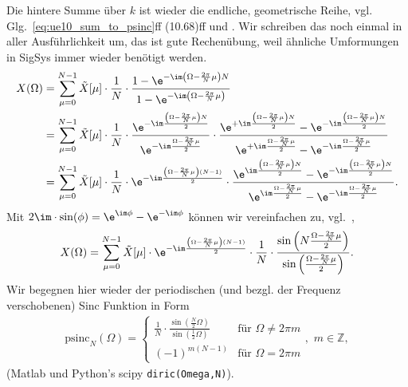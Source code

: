 \begin{ExCalc}
Die hintere Summe über $k$ ist wieder die endliche, geometrische Reihe,
vgl. Glg.~\eqref{eq:ue10_sum_to_psinc}ff (10.68)ff
und \cite[(3-39)]{Lyons2011}.
Wir schreiben das noch einmal in aller Ausführlichkeit um, das ist gute Rechenübung,
weil ähnliche Umformungen in SigSys immer wieder benötigt werden.
%
\begin{align}
X(\Omega)&=\sum_{\mu=0}^{N-1}\tilde{X}[\mu]\cdot\frac{1}{N}\cdot\frac{1-\e^{-\im\left(\Omega-\frac{2\pi}{N}\mu\right)N}}{1-\e^{-\im\left(\Omega-\frac{2\pi}{N}\mu\right)}}\\
&=\sum_{\mu=0}^{N-1}\tilde{X}[\mu]\cdot\frac{1}{N}\cdot\frac{\e^{-\im\frac{\left(\Omega-\frac{2\pi}{N}\mu\right)N}{2}}}{\e^{-\im\frac{\Omega-\frac{2\pi}{N}\mu}{2}}}\cdot\frac{\e^{+\im\frac{\left(\Omega-\frac{2\pi}{N}\mu\right)N}{2}}-\e^{-\im\frac{\left(\Omega-\frac{2\pi}{N}\mu\right)N}{2}}}{\e^{+\im\frac{\Omega-\frac{2\pi}{N}\mu}{2}}-\e^{-\im\frac{\Omega-\frac{2\pi}{N}\mu}{2}}}\\
&=\sum_{\mu=0}^{N-1}\tilde{X}[\mu]\cdot\frac{1}{N}\cdot\e^{-\im\frac{\left(\Omega-\frac{2\pi}{N}\mu\right)(N-1)}{2}}\cdot\frac{\e^{\im\frac{\left(\Omega-\frac{2\pi}{N}\mu\right)N}{2}}-\e^{-\im\frac{\left(\Omega-\frac{2\pi}{N}\mu\right)N}{2}}}{\e^{\im\frac{\Omega-\frac{2\pi}{N}\mu}{2}}-\e^{-\im\frac{\Omega-\frac{2\pi}{N}\mu}{2}}}.
\end{align}
%
Mit $2\im\cdot\sin(\phi)=\e^{\im \phi}-\e^{-\im \phi}$ können wir vereinfachen
zu, vgl.~\cite[(2.41)]{Moeser2011}, \cite[(2.142)]{Rabiner1975}
%
\begin{equation}
X(\Omega)=\sum_{\mu=0}^{N-1}\tilde{X}[\mu]\cdot\e^{-\im\frac{\left(\Omega-\frac{2\pi}{N}\mu\right)(N-1)}{2}}\cdot\frac{1}{N}\cdot\frac{\sin\left(N\frac{\Omega-\frac{2\pi}{N}\mu}{2}\right)}{\sin\left(\frac{\Omega-\frac{2\pi}{N}\mu}{2}\right)}.
\end{equation}
%
Wir begegnen hier wieder der periodischen (und bezgl. der Frequenz verschobenen) Sinc Funktion in Form
%
\begin{align}
\text{psinc}_N(\Omega)=\begin{cases}\frac{1}{N}\cdot\frac{\sin\left(\frac{N}{2}\Omega\right)}{\sin\left(\frac{1}{2}\Omega\right)}&\text{für }\Omega\neq2\pi m\\
(-1)^{m(N-1)}&\text{für }\Omega=2\pi m\end{cases},\,\,m\in\mathbb{Z},
\end{align}
%
(Matlab und Python's scipy \texttt{diric(Omega,N)}).


\end{ExCalc}
